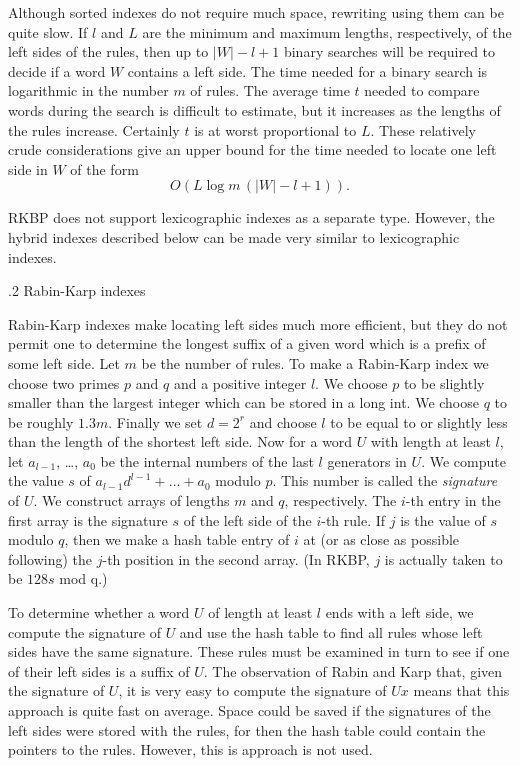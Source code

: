 Although sorted indexes do not require much space, rewriting using
them can be quite slow.  If $l$ and $L$ are the minimum and maximum
lengths, respectively, of the left sides of the rules, then up to
$|W|-l+1$ binary searches will be required to decide if a word $W$
contains a left side.  The time needed for a binary search is
logarithmic in the number $m$ of rules.  The average time $t$ needed
to compare words during the search is difficult to estimate, but it
increases as the lengths of the rules increase.  Certainly $t$ is at
worst proportional to $L$.  These relatively crude considerations give
an upper bound for the time needed to locate one left side in $W$ of
the form $$O(L \log m\,(|W|-l+1)).$$

RKBP does not support lexicographic indexes as a separate type.
However, the hybrid indexes described below can be made very similar
to lexicographic indexes.

\bigskip
{}.2  Rabin-Karp indexes

\nobreak

Rabin-Karp indexes make locating left sides much more efficient, but
they do not permit one to determine the longest suffix of a given word
which is a prefix of some left side. Let $m$ be the number of rules.
To make a Rabin-Karp index we choose two primes $p$ and $q$ and a
positive integer $l$. We choose $p$ to be slightly smaller than the
largest integer which can be stored in a long int. We choose $q$ to be
roughly $1.3m$.  Finally we set $d = 2^r$ and choose $l$ to be equal
to or slightly less than the length of the shortest left side.  Now
for a word $U$ with length at least $l$, let $a_{l-1}$, \dots, $a_0$
be the internal numbers of the last $l$ generators in $U$. We compute
the value $s$ of $a_{l-1}d^{l-1}+\ldots+a_0$ modulo $p$.  This number
is called the {\it signature} of $U$. We construct arrays of lengths
$m$ and $q$, respectively. The $i$-th entry in the first array is the
signature $s$ of the left side of the $i$-th rule. If $j$ is the value
of $s$ modulo $q$, then we make a hash table entry of $i$ at (or as
close as possible following) the $j$-th position in the second array.
(In RKBP, $j$ is actually taken to be $128s$ mod q.)

To determine whether a word $U$ of length at least $l$ ends with a
left side, we compute the signature of $U$ and use the hash table to
find all rules whose left sides have the same signature. These rules
must be examined in turn to see if one of their left sides is a suffix
of $U$. The observation of Rabin and Karp that, given the signature of
$U$, it is very easy to compute the signature of $Ux$ means that this
approach is quite fast on average.  Space could be saved if the
signatures of the left sides were stored with the rules, for then the
hash table could contain the pointers to the rules. However, this is
approach is not used.

